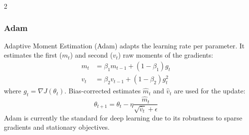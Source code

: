 \begin{multicols}{2}
\subsubsection{Adam}
Adaptive Moment Estimation (Adam) adapts the learning rate per parameter. It estimates the first ($m_t$) and second ($v_t$) raw moments of the gradients:
\begin{align}
    m_t &= \beta_1 m_{t-1} + (1 - \beta_1) g_t \\
    v_t &= \beta_2 v_{t-1} + (1 - \beta_2) g_t^2
\end{align}
where $g_t = \nabla J(\theta_t)$. Bias-corrected estimates $\hat{m}_t$ and $\hat{v}_t$ are used for the update:
\begin{equation}
    \theta_{t+1} = \theta_t - \eta \frac{\hat{m}_t}{\sqrt{\hat{v}_t} + \epsilon}
\end{equation}
Adam is currently the standard for deep learning due to its robustness to sparse gradients and stationary objectives.

\end{multicols}